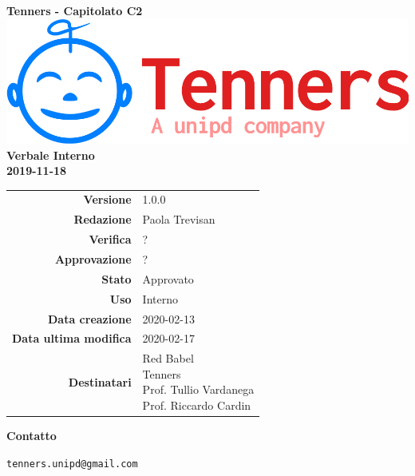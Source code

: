 \begin{titlepage}
	\begin{center}
		\large \textbf{Tenners - Capitolato C2}
		\vfill
		\includegraphics[scale = 0.3]{./res/img/logo.png}\\
		\vfill
		\Huge \textbf{Verbale Interno} \\
		\textbf {2019-11-18}

        \vfill
        \large

        \begin{tabular}{r|l}
        	\textbf{Versione} & 1.0.0 \\
        	\textbf{Redazione} & Paola Trevisan \\
        	\textbf{Verifica} &  ? \\
        	\textbf{Approvazione} & ? \\
        	\textbf{Stato} & Approvato \\
        	\textbf{Uso} &  Interno\\
        	\textbf{Data creazione} &  2020-02-13\\
        	\textbf{Data ultima modifica} & 2020-02-17 \\
        	\textbf{Destinatari} & \parbox[t]{5cm}{Red Babel\\Tenners \\ Prof. Tullio Vardanega\\ Prof. Riccardo Cardin}
        \end{tabular}
    	\vfill
    	\normalsize
    	\vfill
    	\textbf{Contatto}
    	
    	\texttt{tenners.unipd@gmail.com}

	\end{center}
\end{titlepage}